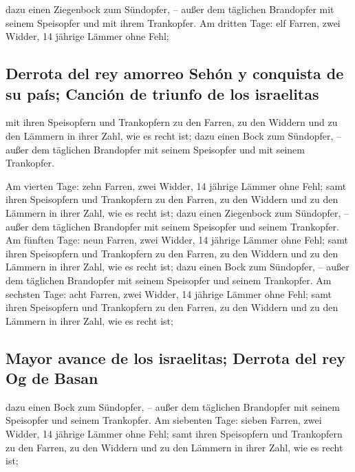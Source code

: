  dazu einen Ziegenbock zum Sündopfer, -- außer dem
täglichen Brandopfer mit seinem Speisopfer und mit ihrem Trankopfer.
 Am dritten Tage: elf Farren, zwei Widder, 14 jährige
Lämmer ohne Fehl;

\hypertarget{derrota-del-rey-amorreo-sehuxf3n-y-conquista-de-su-pauxeds-canciuxf3n-de-triunfo-de-los-israelitas}{%
\subsection{Derrota del rey amorreo Sehón y conquista de su país;
Canción de triunfo de los
israelitas}\label{derrota-del-rey-amorreo-sehuxf3n-y-conquista-de-su-pauxeds-canciuxf3n-de-triunfo-de-los-israelitas}}

 mit ihren Speisopfern und Trankopfern zu den Farren, zu
den Widdern und zu den Lämmern in ihrer Zahl, wie es recht ist;
 dazu einen Bock zum Sündopfer, -- außer dem täglichen
Brandopfer mit seinem Speisopfer und mit seinem Trankopfer.

 Am vierten Tage: zehn Farren, zwei Widder, 14 jährige
Lämmer ohne Fehl;  samt ihren Speisopfern und Trankopfern
zu den Farren, zu den Widdern und zu den Lämmern in ihrer Zahl, wie es
recht ist;  dazu einen Ziegenbock zum Sündopfer, -- außer
dem täglichen Brandopfer mit seinem Speisopfer und seinem Trankopfer.
 Am fünften Tage: neun Farren, zwei Widder, 14 jährige
Lämmer ohne Fehl;  samt ihren Speisopfern und Trankopfern
zu den Farren, zu den Widdern und zu den Lämmern in ihrer Zahl, wie es
recht ist;  dazu einen Bock zum Sündopfer, -- außer dem
täglichen Brandopfer mit seinem Speisopfer und seinem Trankopfer.
 Am sechsten Tage: acht Farren, zwei Widder, 14 jährige
Lämmer ohne Fehl;  samt ihren Speisopfern und Trankopfern
zu den Farren, zu den Widdern und zu den Lämmern in ihrer Zahl, wie es
recht ist;

\hypertarget{mayor-avance-de-los-israelitas-derrota-del-rey-og-de-basan}{%
\subsection{Mayor avance de los israelitas; Derrota del rey Og de
Basan}\label{mayor-avance-de-los-israelitas-derrota-del-rey-og-de-basan}}

 dazu einen Bock zum Sündopfer, -- außer dem täglichen
Brandopfer mit seinem Speisopfer und seinem Trankopfer. 
Am siebenten Tage: sieben Farren, zwei Widder, 14 jährige Lämmer ohne
Fehl;  samt ihren Speisopfern und Trankopfern zu den
Farren, zu den Widdern und zu den Lämmern in ihrer Zahl, wie es recht
ist;

